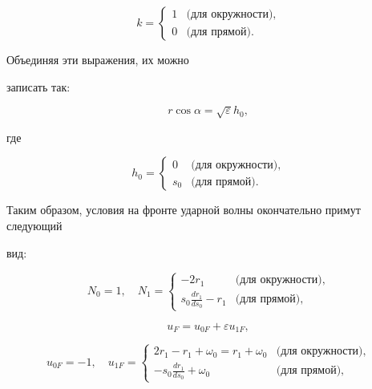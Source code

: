 \[


 k=\begin{cases} 1  &\mbox{(для окружности)},\\


 0 &\mbox{(для прямой)}.


 \end{cases}


\]


 Объединяя эти выражения,  их можно


записать так:


\[


r \cos\alpha = \sqrt\varepsilon h_0,


\]


где


\[


h_0 = \begin{cases} 0  &\mbox{(для окружности)},\\


s_0  &\mbox{(для прямой)}.


\end{cases}


\]


Таким образом,  условия на фронте ударной волны окончательно примут следующий


вид:


\[


N_0 = 1,  \quad N_1 =


\begin{cases}


-2r_1 &\mbox{(для окружности)},\\


s_0 \frac{dr_1}{ds_0} - r_1 &\mbox{(для прямой)},


\end{cases}


\]


\[u_F = u_{0F} + \varepsilon u_{1F},   \]


\[


u_{0F}=-1,  \quad   u_{1F} =


\begin{cases}


2r_1 - r_1 + \omega_0 = r_1 +  \omega_0 &\mbox{(для окружности)},\\


- s_0 \frac{dr_1}{ds_0} + \omega_0  &\mbox{(для прямой)},


\end{cases}


\]


